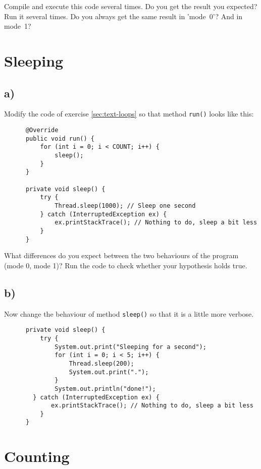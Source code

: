 \documentclass{article}
\begin{document}
Compile and execute this code several times. Do you get the result you
expected? Run it several times. Do you always get the same result in
'mode~0'? And in mode~1?

\section{Sleeping}
\label{sec:sleeping}

\subsection{a) }

Modify the code of exercise \ref{sec:text-loops} so that method
\verb+run()+ looks like this:

\begin{verbatim}
      @Override
      public void run() {
          for (int i = 0; i < COUNT; i++) {
              sleep();
          }
      }

      private void sleep() {
          try {
              Thread.sleep(1000); // Sleep one second
          } catch (InterruptedException ex) {
              ex.printStackTrace(); // Nothing to do, sleep a bit less
          }
      }
\end{verbatim}

What differences do you expect between the two behaviours of the
program (mode 0, mode 1)? Run the code to check whether your
hypothesis holds true. 

\subsection{b)}
\label{sec:b-1}

Now change the behaviour of method \verb+sleep()+ so that it is a
little more verbose. 

\begin{verbatim}
      private void sleep() {
          try { 
              System.out.print("Sleeping for a second");
              for (int i = 0; i < 5; i++) {
                  Thread.sleep(200); 
                  System.out.print(".");
              }
              System.out.println("done!");
	    } catch (InterruptedException ex) {
             ex.printStackTrace(); // Nothing to do, sleep a bit less
          }
      }
\end{verbatim}


\section{Counting}
\label{sec:counter}
\end{document}
